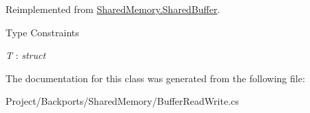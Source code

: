 Reimplemented from \hyperlink{class_shared_memory_1_1_shared_buffer_aff9ac6982aca4308738395c9a583d50e}{Shared\+Memory.\+Shared\+Buffer}.

\begin{Desc}
\item[Type Constraints]\begin{description}
\item[{\em T} : {\em struct}]\end{description}
\end{Desc}


The documentation for this class was generated from the following file\+:\begin{DoxyCompactItemize}
\item 
Project/\+Backports/\+Shared\+Memory/Buffer\+Read\+Write.\+cs\end{DoxyCompactItemize}

